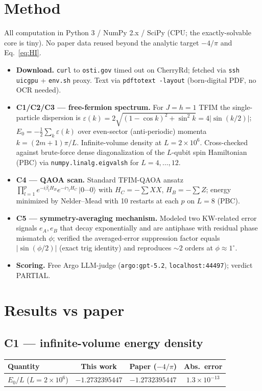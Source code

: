 \documentclass[11pt]{article}
\begin{document}
\section{Method}
All computation in Python 3 / NumPy 2.x / SciPy (CPU; the exactly-solvable core is
tiny). No paper data reused beyond the analytic target $-4/\pi$ and Eq.~\eqref{eq:HI}.
\begin{itemize}
  \item \textbf{Download.} \texttt{curl} to \texttt{osti.gov} timed out on CherryRd;
    fetched via \texttt{ssh uicgpu} + \texttt{env.sh} proxy. Text via
    \texttt{pdftotext -layout} (born-digital PDF, no OCR needed).
  \item \textbf{C1/C2/C3 --- free-fermion spectrum.} For $J=h=1$ TFIM the
    single-particle dispersion is
    $\varepsilon(k) = 2\sqrt{(1-\cos k)^2 + \sin^2 k} = 4|\sin(k/2)|$;
    $E_0 = -\tfrac{1}{2}\sum_k \varepsilon(k)$ over even-sector (anti-periodic)
    momenta $k=(2m+1)\pi/L$. Infinite-volume density at $L=2\!\times\!10^6$.
    Cross-checked against brute-force dense diagonalization of the $L$-qubit spin
    Hamiltonian (PBC) via \texttt{numpy.linalg.eigvalsh} for $L=4,\ldots,12$.
  \item \textbf{C4 --- QAOA scan.} Standard TFIM-QAOA ansatz
    $\prod_{l=1}^{p} e^{-i\beta_l H_B} e^{-i\gamma_l H_C}\,|0\cdots 0\rangle$
    with $H_C = -\sum XX$, $H_B = -\sum Z$; energy minimized by Nelder--Mead with 10
    restarts at each $p$ on $L=8$ (PBC).
  \item \textbf{C5 --- symmetry-averaging mechanism.} Modeled two KW-related error
    signals $e_A, e_B$ that decay exponentially and are antiphase with residual phase
    mismatch $\phi$; verified the averaged-error suppression factor equals
    $|\sin(\phi/2)|$ (exact trig identity) and reproduces $\sim 2$ orders at
    $\phi \approx 1^\circ$.
  \item \textbf{Scoring.} Free Argo LLM-judge (\texttt{argo:gpt-5.2},
    \texttt{localhost:44497}); verdict PARTIAL.
\end{itemize}

\section{Results vs paper}

\subsection*{C1 --- infinite-volume energy density}
\begin{center}
\begin{tabular}{lccc}
\toprule
Quantity & This work & Paper ($-4/\pi$) & Abs.\ error \\
\midrule
$E_0/L$ ($L=2\!\times\!10^6$) & $-1.2732395447$ & $-1.2732395447$ & $1.3\!\times\!10^{-13}$ \\
\bottomrule
\end{tabular}
\end{center}
\end{document}
